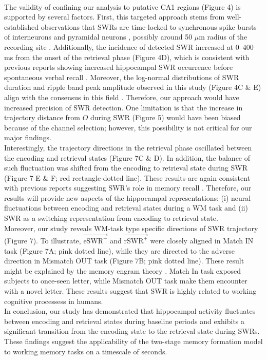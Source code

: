 \\
\indent
The validity of confining our analysis to putative CA1 regions (Figure 4) is supported by several factors. First, this targeted approach stems from well-established observations that SWRs are time-locked to synchronous spike bursts of interneurons and pyramidal neurons \cite{buzsaki_two-stage_1989} \cite{quyen_cell_2008} \cite{royer_control_2012} \cite{hajos_input-output_2013}, possibly around 50 $\mu$m radius of the recording site \cite{schomburg_spiking_2012}. Additionally, the incidence of detected SWR increased at 0--400 ms from the onset of the retrieval phase (Figure 4D), which is consistent with previous reports showing increased hippocampal SWR occurrence before spontaneous verbal recall \cite{norman_hippocampal_2019} \cite{norman_hippocampal_2021}. Moreover, the log-normal distributions of SWR duration and ripple band peak amplitude observed in this study (Figure 4C \& E) align with the consensus in this field \cite{liu_consensus_2022}. Therefore, our approach would have increased precision of SWR detection. One limitation is that the increase in trajectory distance from $O$ during SWR (Figure 5) would have been biased because of the channel selection; however, this possibility is not critical for our major findings.
\\
\indent
Interestingly, the trajectory directions in the retrieval phase oscillated between the encoding and retrieval states (Figure 7C \& D). In addition, the balance of such fluctuation was shifted from the encoding to retrieval state during SWR (Figure 7 E \& F; red rectangle-dotted line). These results are again consistent with previous reports suggesting SWR's role in memory recall \cite{norman_hippocampal_2019} \cite{norman_hippocampal_2021}. Therefore, our results will provide new aspects of the hippocampal representations: (i) neural fluctuations between encoding and retrieval states during a WM task and (ii) SWR as a switching representation from encoding to retrieval state.
\\
\indent
Moreover, our study reveals WM-task type specific directions of SWR trajectory (Figure 7). To illustrate, $\overrightarrow{\mathrm{eSWR^+}}$ and $\overrightarrow{\mathrm{rSWR^+}}$ were closely aligned in Match IN task (Figure 7A; pink dotted line), while they are directed to the adverse direction in Mismatch OUT task (Figure 7B; pink dotted line). These result might be explained by the memory engram theory \cite{liu_optogenetic_2012}. Match In task exposed subjects to once-seen letter, while Mismatch OUT task make them encounter with a novel letter. These results suggest that SWR is highly related to working cognitive processess in humans.
\\
\indent
In conclusion, our study has demonstrated that hippocampal activity fluctuates between encoding and retrieval states during baseline periods and exhibits a significant transition from the encoding state to the retrieval state during SWRs. These findings suggest the applicability of the two-stage memory formation model \cite{buzsaki_two-stage_1989} to working memory tasks on a timescale of seconds.

\label{sec:discussion}
